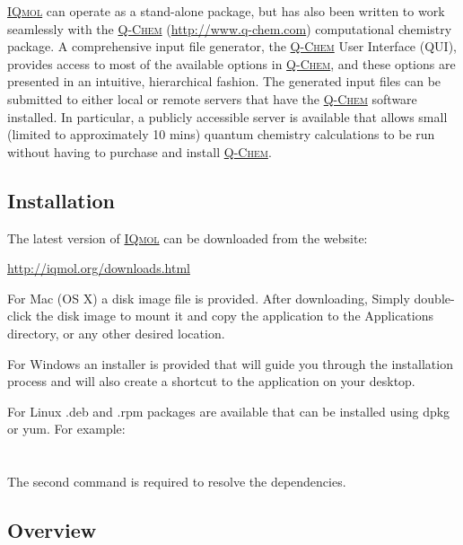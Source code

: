 \documentclass[a4paper,12pt]{article}
\newcommand{\qchem}{\href{http://q-chem.com}{{\scshape Q-Chem}}}
\newcommand{\iqmol}{\href{http://iqmol.org}{{\scshape IQmol}}}
\begin{document}
\iqmol{} can operate as a stand-alone package, but has also been written to
work seamlessly with the \qchem{} (\url{http://www.q-chem.com}) computational
chemistry package.  A comprehensive input file generator, the \qchem{} User
Interface (QUI), provides access to most of the available options in \qchem{},
and these options are presented in an intuitive, hierarchical fashion.   The
generated input files can be submitted to either local or remote servers that
have the \qchem{} software installed.  In particular, a publicly accessible
server is available that allows small (limited to approximately 10 mins)
quantum chemistry calculations to be run without having to purchase and install
\qchem{}.



\subsection{Installation}

The latest version of \iqmol{} can be downloaded from the website:
\vspace{-1.0em}
\begin{center}
\url{http://iqmol.org/downloads.html}
\end{center}
\vspace{-1.0em}

For Mac (OS X) a disk image file is provided.  After downloading, Simply
double-click the disk image to mount it and copy the application to the
Applications directory, or any other desired location.

For Windows an installer is provided that will guide you through the
installation process and will also create a shortcut to the application on your
desktop.

For Linux .deb and .rpm packages are available that can be installed using dpkg
or yum.  For example:\\
\hspace*{2em}{\tt \#>  sudo dpkg -i iqmol\_2.9.0.deb}\\
\hspace*{2em}{\tt \#> sudo apt-get install -f }\\
The second command is required to resolve the dependencies.


\newpage
\subsection{Overview}
\label{sec:overview}
\end{document}
